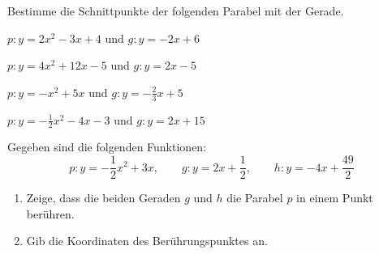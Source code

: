 \documentclass[11pt,oneside]{article}
\begin{document}
	\begin{aufgabe}
		Bestimme die Schnittpunkte der folgenden Parabel mit der Gerade.
		\begin{enumcols}[2]
			\item $\displaystyle p:y=2x^2-3x+4 \text{ und } g:y=-2x+6$
			\item $\displaystyle p:y=4x^2+12x-5\text{ und } g:y=2x-5$
			\item $\displaystyle p:y=-x^2+5x \text{ und } g:y=-\frac{2}{3}x+5$
			\item $\displaystyle p:y=-\frac{1}{2}x^2-4x-3 \text{ und } g:y=2x+15$
		\end{enumcols}
	\end{aufgabe}
	\begin{aufgabe}
		Gegeben sind die folgenden Funktionen: \[p:y=-\frac{1}{2}x^2+3x,\qquad g:y=2x+\frac{1}{2},\qquad h:y=-4x+\frac{49}{2}\]
		\begin{enumerate}[label=\alph*)]
			\item Zeige, dass die beiden Geraden $g$ und $h$ die Parabel $p$ in einem Punkt berühren.
			\item Gib die Koordinaten des Berührungspunktes an.
		\end{enumerate}
	\end{aufgabe}
\end{document}
